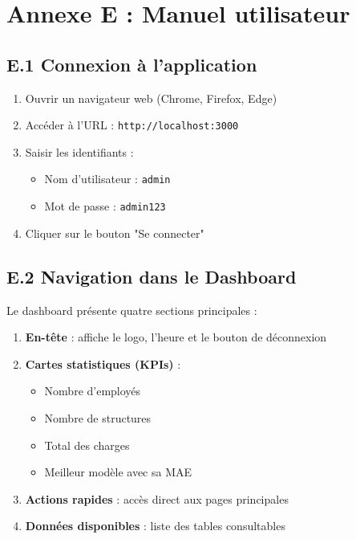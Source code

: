 \newpage

\section*{Annexe E : Manuel utilisateur}

\subsection*{E.1 Connexion à l'application}

\begin{enumerate}
    \item Ouvrir un navigateur web (Chrome, Firefox, Edge)
    \item Accéder à l'URL : \texttt{http://localhost:3000}
    \item Saisir les identifiants :
    \begin{itemize}
        \item Nom d'utilisateur : \texttt{admin}
        \item Mot de passe : \texttt{admin123}
    \end{itemize}
    \item Cliquer sur le bouton "Se connecter"
\end{enumerate}


\subsection*{E.2 Navigation dans le Dashboard}

Le dashboard présente quatre sections principales :

\begin{enumerate}
    \item \textbf{En-tête} : affiche le logo, l'heure et le bouton de déconnexion
    \item \textbf{Cartes statistiques (KPIs)} : 
    \begin{itemize}
        \item Nombre d'employés
        \item Nombre de structures
        \item Total des charges
        \item Meilleur modèle avec sa MAE
    \end{itemize}
    \item \textbf{Actions rapides} : accès direct aux pages principales
    \item \textbf{Données disponibles} : liste des tables consultables
\end{enumerate}

